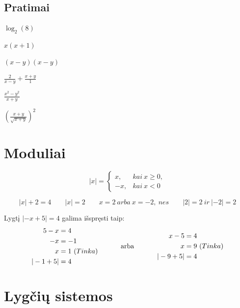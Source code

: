 \documentclass[fleqn]{article} %
\newenvironment{exercises}{\begin{enumerate*}[label=\alph*), itemjoin=\qquad]}{\end{enumerate*}}
\DeclareMathOperator{\arba}{\ arba\ }
\begin{document}
\subsection{Pratimai}

\begin{exercises}
    \item $\log_2(8)                         $
    \item $x(x + 1)                          $
    \item $(x - y)(x - y)                    $
    \item $\frac{2}{x - y} + \frac{x + y}{1} $
    \item $\frac{x^2 - y^2}{x + y}           $
    \item $(\frac{x + y}{\sqrt{x + y}})^2$
\end{exercises} 

\section{Moduliai}

\[
|x| =
\begin{cases}
    x,  &kai\ x \ge 0, \\
    -x, &kai\ x < 0
\end{cases}     
\]

\[
|x| + 2 = 4 \qquad
|x| = 2     \qquad
x = 2\ arba\ x = -2,\ nes \qquad
|2| = 2\ ir\ |-2| = 2
\]


Lygtį $|-x + 5| = 4$ galima išspręsti taip:
\begin{equation}
    \begin{aligned}
        5 - x &= 4 \\
        -x &= -1 \\
        x &= 1\ (Tinka) \\
        |-1 + 5| &= 4
    \end{aligned}
    \hspace{10mm}
    \arba
    \hspace{10mm}
    \begin{aligned}
        x - 5 &= 4 \\
        x &= 9\ (Tinka) \\
        |-9 + 5| &= 4
    \end{aligned}    
\end{equation}


\section{Lygčių sistemos}
\end{document}
